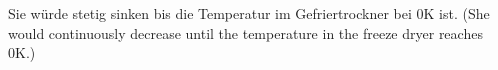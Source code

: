 Sie würde stetig sinken bis die Temperatur im Gefriertrockner bei 0K ist.  
(She would continuously decrease until the temperature in the freeze dryer reaches 0K.)